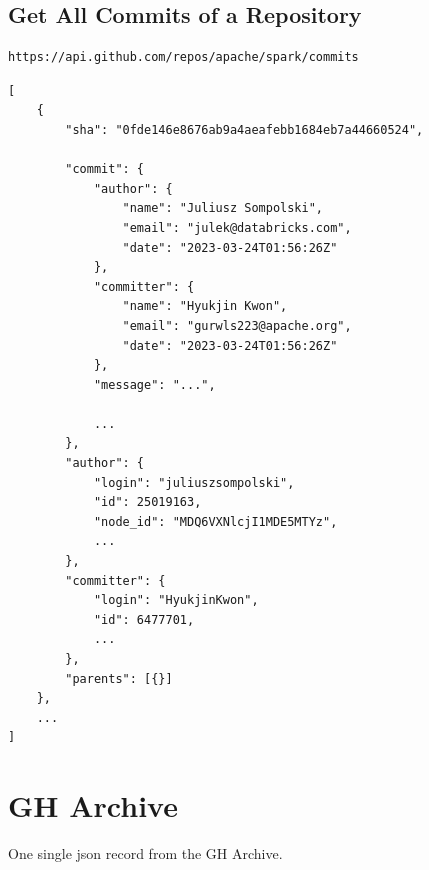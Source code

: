 \subsection{Get All Commits of a Repository}

\begin{verbatim}
https://api.github.com/repos/apache/spark/commits
\end{verbatim}


\begin{verbatim}
[
    {
        "sha": "0fde146e8676ab9a4aeafebb1684eb7a44660524",

        "commit": {
            "author": {
                "name": "Juliusz Sompolski",
                "email": "julek@databricks.com",
                "date": "2023-03-24T01:56:26Z"
            },
            "committer": {
                "name": "Hyukjin Kwon",
                "email": "gurwls223@apache.org",
                "date": "2023-03-24T01:56:26Z"
            },
            "message": "...",

            ...
        },
        "author": {
            "login": "juliuszsompolski",
            "id": 25019163,
            "node_id": "MDQ6VXNlcjI1MDE5MTYz",
            ...
        },
        "committer": {
            "login": "HyukjinKwon",
            "id": 6477701,
            ...
        },
        "parents": [{}]
    },
    ...
]
\end{verbatim}




\section{GH Archive}
\label{a-gha}

One single json record from the GH Archive.

